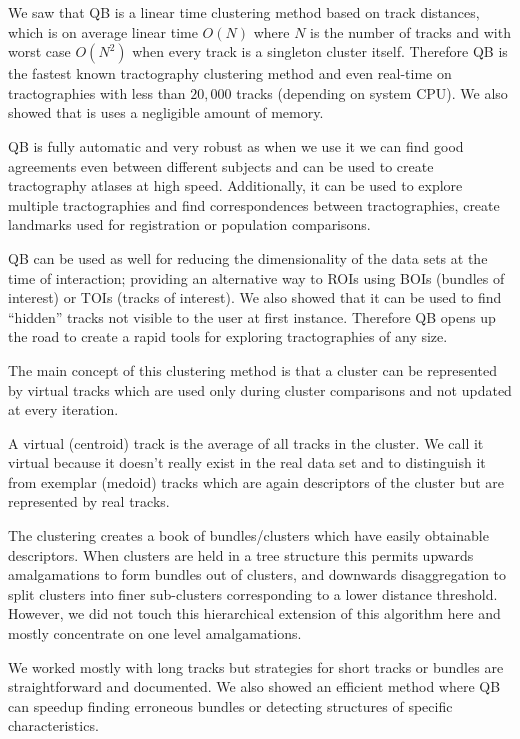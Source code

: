 \documentclass[preprint,authoryear,a4paper,10pt,onecolumn]{elsarticle}
\begin{document}
We saw that QB is a linear time clustering method based on track
distances, which is on average linear time $O(N)$ where $N$ is the
number of tracks and with worst case $O(N^{2})$ when every track is a
singleton cluster itself. Therefore QB is the fastest known tractography
clustering method and even real-time on tractographies with less than
$20,000$ tracks (depending on system CPU). We also showed that is uses a
negligible amount of memory.

QB is fully automatic and very robust as when we use it we can find good
agreements even between different subjects and can be used to create
tractography atlases at high speed. Additionally, it can be used to
explore multiple tractographies and find correspondences between
tractographies, create landmarks used for registration or population
comparisons.

QB can be used as well for reducing the dimensionality of the data sets
at the time of interaction; providing an alternative way to ROIs using
BOIs (bundles of interest) or TOIs (tracks of interest). We also showed
that it can be used to find ``hidden'' tracks not visible to the user
at first instance. Therefore QB opens up the road to create a rapid
tools for exploring tractographies of any size.

The main concept of this clustering method is that a cluster can be
represented by virtual tracks which are used only during cluster
comparisons and not updated at every iteration.

A virtual (centroid) track is the average of all tracks in the cluster.
We call it virtual because it doesn't really exist in the real data set
and to distinguish it from exemplar (medoid) tracks which are again
descriptors of the cluster but are represented by real tracks.

The clustering creates a book of bundles/clusters which have easily
obtainable descriptors. When clusters are held in a tree structure this
permits upwards amalgamations to form bundles out of clusters, and
downwards disaggregation to split clusters into finer sub-clusters
corresponding to a lower distance threshold. However, we did not touch
this hierarchical extension of this algorithm here and mostly
concentrate on one level amalgamations.

We worked mostly with long tracks but strategies for short tracks
or bundles are straightforward and documented. We also showed an efficient
method where QB can speedup finding erroneous bundles or detecting
structures of specific characteristics.
\end{document}
